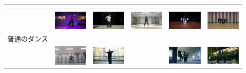 \begin{table}[t]
\begin{center}
\begin{tabular}{|c|ccc|cc|}
      \\
        & \cite{thai} & \cite{jpn2} & & \cite{chinagroup} & \cite{belly}
      \\ \hline
        &&&&& \\
        & \includegraphics[width=17mm]{images/snaps/ariana_dance.png}
        & \includegraphics[width=17mm]{images/snaps/kadokawa_dream_dance.png}
        & \includegraphics[width=17mm]{images/snaps/bts_dance.png}
        & \includegraphics[width=17mm]{images/snaps/bts_group_dance.png}
        & \includegraphics[width=17mm]{images/snaps/arashi_group_dance.png}
      \\
      普通のダンス & \cite{ariana} & \cite{kadokawa} & \cite{bts} & \cite{btsgroup} & \cite{arashi}
      \\
        & \includegraphics[width=17mm]{images/snaps/manolo_dance.png}
        & \includegraphics[width=17mm]{images/snaps/aito_dance.png}
        &
        & \includegraphics[width=17mm]{images/snaps/hyoga_dance.png}
        & \includegraphics[width=17mm]{images/snaps/legit_dance.png}
      \\

\end{tabular}
\end{center}
\end{table}
